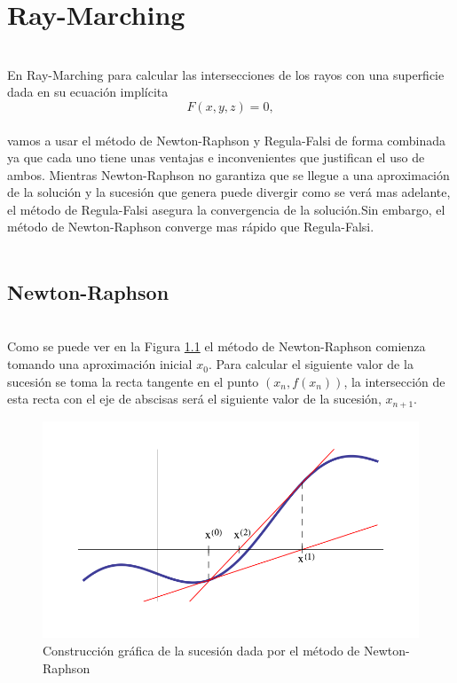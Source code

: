 \chapter{Ray-Marching}

${ }$\\

En Ray-Marching para calcular las intersecciones de los rayos con una superficie dada en su ecuación implícita
${ }$\\
\[
	F(x,y,z) = 0,
\]
${ }$\\
vamos a usar el método de Newton-Raphson y Regula-Falsi de forma combinada ya que cada uno tiene unas ventajas e inconvenientes que justifican el uso de ambos. Mientras Newton-Raphson no garantiza que se llegue a una aproximación de la solución y la sucesión que genera puede divergir como se verá mas adelante, el método de Regula-Falsi asegura la convergencia de la solución.Sin embargo, el método de Newton-Raphson converge mas rápido que Regula-Falsi.
${ }$\\

${ }$\\
\section{Newton-Raphson}
${ }$\\

Como se puede ver en la Figura \ref{fig:etiq_7} el método de Newton-Raphson comienza tomando una aproximación inicial $x_0$. Para calcular el siguiente valor de la sucesión se toma la recta tangente en el punto $(x_n, f(x_n))$, la intersección de esta recta con el eje de abscisas será el siguiente valor de la sucesión, $x_{n+1}$.
${ }$\\

\begin{figure}[h]
	\begin{center}
		\includegraphics[width=1.0\textwidth]{imagenes/newton.png}
	\end{center}
	\caption{Construcción gráfica de la sucesión dada por el método de Newton-Raphson}
	\label{fig:etiq_7}
\end{figure}

